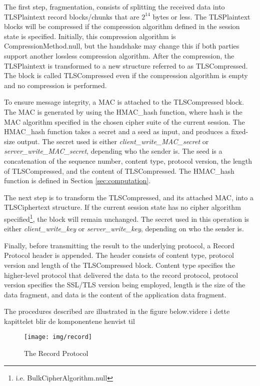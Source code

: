 \documentclass[12pt,a4paper,titlepage]{report}
\begin{document}
The first step, fragmentation, consists of splitting the received data into TLSPlaintext record blocks/chunks that are $2^{14}$ bytes or less. The TLSPlaintext blocks will be compressed if the compression algorithm defined in the session state is specified. Initially, this compression algorithm is CompressionMethod.null, but the handshake may change this if both parties support another lossless compression algorithm. After the compression, the TLSPlaintext is transformed to a new structure referred to as TLSCompressed. The block is called TLSCompressed even if the compression algorithm is empty and no compression is performed. \cite{rfc2246}

To ensure message integrity, a MAC is attached to the TLSCompressed block. The MAC is generated by using the HMAC\_hash function, where hash is the MAC algorithm specified in the chosen cipher suite of the current session. The HMAC\_hash function takes a secret and a seed as input, and produces a fixed-size output. The secret used is either \emph{client\_write\_MAC\_secret} or \emph{server\_write\_MAC\_secret}, depending who the sender is. The seed is a concatenation of the sequence number, content type, protocol version, the length of TLSCompressed, and the content of TLSCompressed. The HMAC\_hash function is defined in Section \ref{sec:computation}. 
                     
The next step is to transform the TLSCompressed, and its attached MAC, into a TLSCiphertext structure. If the current session state has no cipher algorithm specified\footnote{i.e. BulkCipherAlgorithm.null}, the block will remain unchanged. The secret used in this operation is either \emph{client\_write\_key} or \emph{server\_write\_key}, depending on who the sender is. \cite{rfc2246}

Finally, before transmitting the result to the underlying protocol, a Record Protocol header is appended. The header consists of content type, protocol version and length of the TLSCompressed block. Content type specifies the higher-level protocol that delivered the data to the record protocol, protocol version specifies the SSL/TLS version being employed, length is the size of the data fragment, and data is the content of the application data fragment. \cite{rfc2246}

The procedures described are illustrated in the figure below.videre i dette kapittelet blir de komponentene henvist til

\begin{figure}[H]
\begin{center}
\texttt{[image: img/record]}
\caption{The Record Protocol}
\end{center}
\end{figure}
\end{document}
